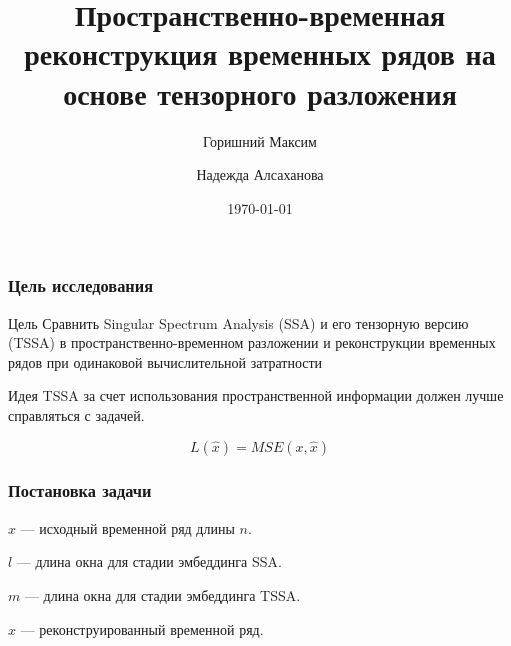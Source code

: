\documentclass[
	11pt, %
]{beamer}
\title[]{Пространственно-временная реконструкция временных рядов на основе тензорного разложения} %
\author[Горишний Максим \and Надежда Алсаханова]{Горишний Максим \and Надежда Алсаханова} %
\institute[]{МФТИ} %
\date[\today]{\today} %
\begin{document}

\begin{frame}
	\titlepage %
\end{frame}




\begin{frame}
	\frametitle{Цель исследования}

\begin{block}{Цель}
Сравнить Singular Spectrum Analysis (SSA) и его тензорную версию (TSSA) в пространственно-временном разложении и реконструкции временных рядов при одинаковой вычислительной затратности
\end{block}

\begin{block}{Идея}
TSSA за счет использования пространственной информации должен лучше справляться с задачей.
\end{block}

\begin{equation*}
L(\hat{x}) = MSE(x, \hat{x})
\end{equation*}

\end{frame}

\begin{frame}
    \frametitle{Постановка задачи}

\(x\) --- исходный временной ряд длины \(n\).

\(l\) --- длина окна для стадии эмбеддинга SSA.

\(m\) --- длина окна для стадии эмбеддинга TSSA.

\(\hat{x}\) --- реконструированный временной ряд.

\end{frame}

\end{document}
